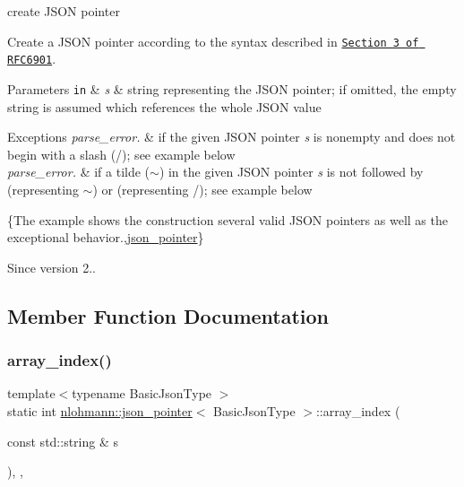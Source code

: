 create J\+S\+ON pointer 

Create a J\+S\+ON pointer according to the syntax described in \href{https://tools.ietf.org/html/rfc6901#section-3}{\tt Section 3 of R\+F\+C6901}.


\begin{DoxyParams}[1]{Parameters}
\mbox{\tt in}  & {\em s} & string representing the J\+S\+ON pointer; if omitted, the empty string is assumed which references the whole J\+S\+ON value\\
\hline
\end{DoxyParams}

\begin{DoxyExceptions}{Exceptions}
{\em parse\+\_\+error.} & if the given J\+S\+ON pointer {\itshape s} is nonempty and does not begin with a slash ({\ttfamily /}); see example below\\
\hline
{\em parse\+\_\+error.} & if a tilde ({\ttfamily $\sim$}) in the given J\+S\+ON pointer {\itshape s} is not followed by {} (representing {\ttfamily $\sim$}) or {} (representing {\ttfamily /}); see example below\\
\hline
\end{DoxyExceptions}
\{The example shows the construction several valid J\+S\+ON pointers as well as the exceptional behavior.,\hyperlink{classnlohmann_1_1json__pointer}{json\+\_\+pointer}\}

\begin{DoxySince}{Since}
version 2.. 
\end{DoxySince}


\subsection{Member Function Documentation}
\mbox{\label{classnlohmann_1_1json__pointer_ac53f5b79dd91da78743c437832f57ce4}} 
\subsubsection{\texorpdfstring{array\+\_\+index()}{array\_index()}}
{\footnotesize\ttfamily template$<$typename Basic\+Json\+Type $>$ \\
static int \hyperlink{classnlohmann_1_1json__pointer}{nlohmann\+::json\+\_\+pointer}$<$ Basic\+Json\+Type $>$\+::array\+\_\+index (\begin{DoxyParamCaption}\item[{const std\+::string \&}]{s }\end{DoxyParamCaption})\hspace{0.3cm}{\ttfamily [inline]}, {\ttfamily [static]}, {\ttfamily [private]}}


